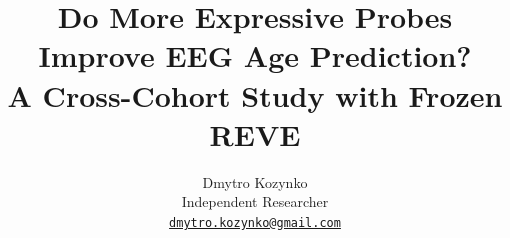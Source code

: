 \documentclass[11pt]{article}
\title{Do More Expressive Probes Improve EEG Age Prediction?\\
A Cross-Cohort Study with Frozen REVE}
\author{Dmytro Kozynko\\
\small Independent Researcher\\
\small\href{mailto:dmytro.kozynko@gmail.com}{\texttt{dmytro.kozynko@gmail.com}}}
\date{}
\begin{document}
\maketitle
\begin{abstract}

\end{abstract}









\begingroup
\small


\endgroup
\clearpage
\appendix

\end{document}
